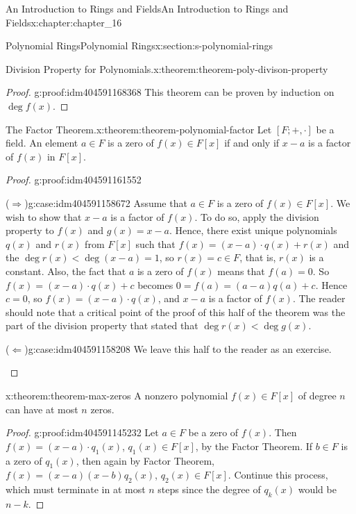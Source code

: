 \documentclass[twoside,10pt,]{book}
\newcommand{\forwardimplication}{($\Rightarrow$)}
\newcommand{\backwardimplication}{($\Leftarrow$)}
\numberwithin{equation}{section}
\begin{document}
\begin{chapterptx}{An Introduction to Rings and Fields}{}{An Introduction to Rings and Fields}{}{}{x:chapter:chapter_16}
\begin{sectionptx}{Polynomial Rings}{}{Polynomial Rings}{}{}{x:section:s-polynomial-rings}
\begin{theorem}{Division Property for Polynomials.}{}{x:theorem:theorem-poly-divison-property}
\end{theorem}
\begin{proof}{}{g:proof:idm404591168368}
This theorem can be proven by induction on \(\deg  f(x)\).%
\end{proof}
\begin{theorem}{The Factor Theorem.}{}{x:theorem:theorem-polynomial-factor}%
%
Let \([F; +, \cdot ]\) be a field. An element \(a \in  F\) is a zero of \(f(x) \in  F[x]\) if and only if \(x - a\) is a factor of \(f(x)\) in \(F[x]\).%
\end{theorem}
\begin{proof}{}{g:proof:idm404591161552}
\begin{case}{\forwardimplication}{}{g:case:idm404591158672}
Assume that \(a \in  F\) is a zero of \(f(x) \in  F[x]\). We wish to show that \(x - a\) is a factor of \(f(x)\). To do so, apply the division property to \(f(x)\) and \(g(x) = x - a\). Hence, there exist unique polynomials \(q(x)\) and \(r(x)\) from \(F[x]\) such that \(f(x) = (x - a)\cdot q(x) + r(x)\) and the \(\deg  r(x) < \deg(x - a) = 1\), so \(r (x) = c \in  F\), that is, \(r(x)\) is a constant. Also, the fact that \(a\) is a zero of \(f(x)\) means that \(f(a) = 0\).    So  \(f(x) = (x - a)\cdot  q(x) + c\)  becomes \(0 = f(a) = (a - a) q(a) + c\). Hence \(c
= 0\), so \(f(x) = (x - a) \cdot  q(x)\), and \(x - a\) is a factor of \(f(x)\). The reader should note that a critical point of the proof of this half of the theorem was the part of the division property that stated that \(\deg  r(x) < \deg  g(x)\).%
\end{case}
\begin{case}{\backwardimplication}{}{g:case:idm404591158208}
We leave this half to the reader as an exercise.%
\end{case}
\end{proof}
\begin{theorem}{}{}{x:theorem:theorem-max-zeros}%
A nonzero polynomial \(f(x) \in  F[x]\) of degree \(n\) can have at most \(n\) zeros.%
\end{theorem}
\begin{proof}{}{g:proof:idm404591145232}
Let \(a \in  F\) be a zero of \(f(x)\). Then \(f(x) = (x - a) \cdot  q_1(x)\), \(q_1(x)\in F[x]\), by the Factor Theorem. If \(b \in  F\) is a zero of \(q_1(x)\), then again by Factor Theorem, \(f(x) = (x -a)(x - b)q_2(x)\), \(q_2(x)\in F[x]\). Continue this process, which must terminate in at most \(n\) steps since the degree of \(q_k(x)\) would be \(n-k\).%
\end{proof}

\end{sectionptx}
\end{chapterptx}
\end{document}
